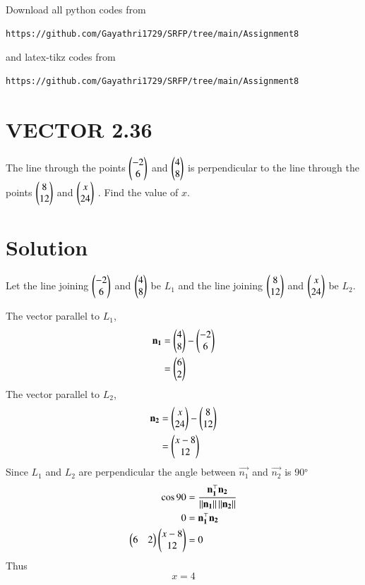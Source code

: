 \documentclass[journal,12pt,twocolumn]{IEEEtran}
\begin{document}
   Download all python codes from 
\begin{lstlisting}
https://github.com/Gayathri1729/SRFP/tree/main/Assignment8
\end{lstlisting}
%
and latex-tikz codes from 
%
\begin{lstlisting}
https://github.com/Gayathri1729/SRFP/tree/main/Assignment8
\end{lstlisting}
%
\section{VECTOR 2.36}
The line through the points $\begin{pmatrix}-2 \\ 6\end{pmatrix}$ and $\begin{pmatrix}4 \\ 8\end{pmatrix}$ is perpendicular to the line through the points $\begin{pmatrix}8 \\ 12\end{pmatrix}$ and $\begin{pmatrix}x \\ 24\end{pmatrix}$ . Find the value of $x$.
\section{Solution}
Let the line joining $\begin{pmatrix}-2 \\ 6\end{pmatrix}$ and $\begin{pmatrix}4 \\ 8\end{pmatrix}$ be $L_1$ and the line joining $\begin{pmatrix}8 \\ 12\end{pmatrix}$ and $\begin{pmatrix}x \\ 24\end{pmatrix}$ be $L_2$.

The vector parallel to $L_1$,
\begin{align}
    \mathbf{n_1} &= \begin{pmatrix}4 \\ 8\end{pmatrix} - \begin{pmatrix}-2 \\ 6\end{pmatrix}\\
    &= \begin{pmatrix}6 \\ 2\end{pmatrix}
\end{align}
The vector parallel to $L_2$,
\begin{align}
     \mathbf{n_2} &= \begin{pmatrix}x \\ 24\end{pmatrix} - \begin{pmatrix}8 \\ 12\end{pmatrix}\\
    &= \begin{pmatrix}x - 8 \\ 12\end{pmatrix}
\end{align}
Since $L_1$ and $L_2$ are perpendicular the angle between  $\vec{n_1}$ and $\vec{n_2}$ is 90$\degree$
\begin{align}
    \cos{90} &= \frac{\mathbf{n_1^\top}\mathbf{n_2}}{\left\lVert\mathbf{n_1}\right\rVert \left\lVert\mathbf{n_2}\right\rVert}\\
  0 &= \mathbf{n_1^\top}\mathbf{n_2}\\
  \begin{pmatrix}6 & 2\end{pmatrix} \begin{pmatrix}x - 8 \\ 12\end{pmatrix}&=0
\end{align}
Thus \begin{equation}
    x = 4
\end{equation}
\end{document}
